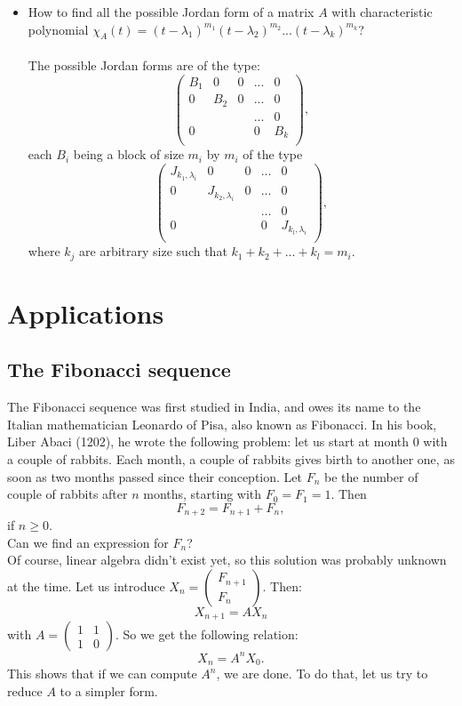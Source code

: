 \begin{itemize}
\item How to find all the possible Jordan form of a matrix $A$ with characteristic polynomial $\chi_A(t) = (t-\lambda_1)^{m_1}(t-\lambda_2)^{m_2}...(t-\lambda_k)^{m_k} $? \\
\ \\
The possible Jordan forms are of the type:
\[\begin{pmatrix}
B_1 & 0 & 0 & ... & 0 \\
0 & B_2 & 0 & ... & 0  \\
  &   &         &  ...   &  0 \\
0 &   &         &  0   & B_k \\
\end{pmatrix},\]
each $B_i$ being a block of size $m_i$ by $m_i$ of the type
\[\begin{pmatrix}
J_{k_1,\lambda_i} & 0 & 0 & ... & 0 \\
0 & J_{k_2,\lambda_i} & 0 & ... & 0  \\
  &   &         &  ...   &  0 \\
0 &   &         &  0   & J_{k_l,\lambda_i} \\
\end{pmatrix},\] 
where $k_j$ are arbitrary size such that $k_1+k_2+...+k_l = m_i$.
\end{itemize}

\section{Applications}

\subsection{The Fibonacci sequence}

The Fibonacci sequence was first studied in India, and owes its name to the Italian mathematician Leonardo of Pisa, also known as Fibonacci. In his book, Liber Abaci (1202), he wrote the following problem: let us start at month $0$ with a couple of rabbits. Each month, a couple of rabbits gives birth to another one, as soon as two months passed since their conception. Let $F_n$ be the number of couple of rabbits after $n$ months, starting with $F_0 = F_1 = 1$. Then 
\[F_{n+2} = F_{n+1}+ F_n,\]
if $n\geq 0$.\\

Can we find an expression for $F_n$?\\

Of course, linear algebra didn't exist yet, so this solution was probably unknown at the time. Let us introduce $X_n = \begin{pmatrix} F_{n+1} \\ F_{n}\end{pmatrix}$. Then:
\[X_{n+1} = A X_n\]
with $A=\begin{pmatrix} 1 & 1 \\ 1 & 0 \end{pmatrix}$. So we get the following relation:
\[X_n = A^n X_0.\]
This shows that if we can compute $A^n$, we are done. To do that, let us try to reduce $A$ to a simpler form. \\

